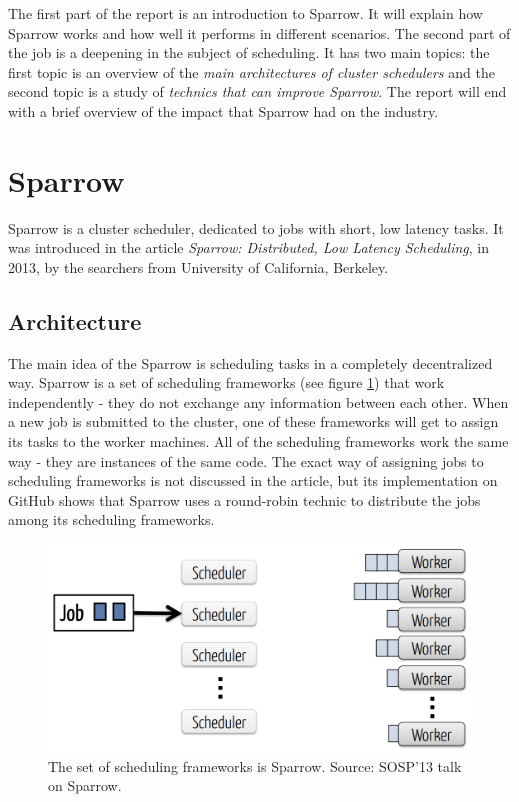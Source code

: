\documentclass[11pt]{article}
\begin{document}
    The first part of the report is an introduction to Sparrow. It will explain how Sparrow works and how well it performs in different scenarios. The second part of the job is a deepening in the subject of scheduling. It has two main topics: the first topic is an overview of the \textit{main architectures of cluster schedulers} and the second topic is a study of \textit{technics that can improve Sparrow}. The report will end with a brief overview of the impact that Sparrow had on the industry.

\section{Sparrow}

	Sparrow is a cluster scheduler, dedicated to jobs with short, low latency tasks. It was introduced in the article \textit{Sparrow: Distributed, Low Latency Scheduling}, in 2013, by the searchers from University of California, Berkeley.


	\subsection{Architecture}
    	\label{sparrowarchie}

		The main idea of the Sparrow is scheduling tasks in a completely decentralized way. Sparrow is a set of scheduling frameworks (see figure \ref{fig1}) that work independently - they do not exchange any information between each other. When a new job is submitted to the cluster, one of these frameworks will get to assign its tasks to the worker machines. All of the scheduling frameworks work the same way - they are instances of the same code. The exact way of assigning jobs to scheduling frameworks is not discussed in the article, but its implementation on GitHub shows that Sparrow uses a round-robin technic to distribute the jobs among its scheduling frameworks.
		
	\begin{figure}
		\centering
		\includegraphics[scale=.25]{sparrow}
		\caption{The set of scheduling frameworks is Sparrow. Source: SOSP'13 talk on Sparrow.}
		\label{fig1}
	\end{figure}
\end{document}

